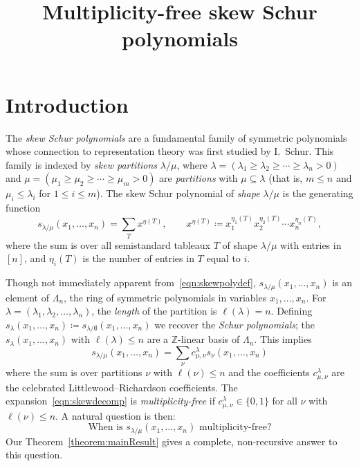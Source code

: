 \documentclass[ALCO,ThmDefs,Unicode,epreuves]{cedram}
\author{\firstname{Shiliang} \lastname{Gao}}
\author{\firstname{Reuven} \lastname{Hodges}}
\author{\firstname{Gidon} \lastname{Orelowitz}}
\title{Multiplicity-free skew Schur polynomials}
\begin{document}
\maketitle



\section{Introduction}\label{sec:intro}

The \emph{skew Schur polynomials} are a fundamental family of symmetric polynomials whose connection to representation theory was first studied by I.~Schur. This family is indexed by \emph{skew partitions} $\lambda / \mu$, where $\lambda = (\lambda_1 \geq \lambda_2 \geq \cdots \geq \lambda_n > 0)$ and $\mu = (\mu_1 \geq \mu_2 \geq \cdots \geq \mu_m > 0)$ are \emph{partitions} with $\mu \subseteq \lambda$ (that is, $m \leq n$ and $\mu_i \leq \lambda_i$ for $1\leq i \leq m$). The skew Schur polynomial of \emph{shape} $\lambda / \mu$ is the generating function
\begin{equation}
\label{eqn:skewpolydef}
s_{\lambda / \mu}(x_1,\ldots,x_n) = \sum_T x^{\eta(T)}, \qquad x^{\eta(T)}\coloneqq x_1^{\eta_1(T)}x_2^{\eta_2(T)}\cdots x_n^{\eta_n(T)},
\end{equation}
where the sum is over all semistandard tableaux $T$ of shape $\lambda / \mu$ with entries in $[n]$, and $\eta_i(T)$ is the number of entries in $T$ equal to $i$.

Though not immediately apparent from~\eqref{eqn:skewpolydef}, $s_{\lambda / \mu}(x_1,\ldots,x_n)$ is an element of $\Lambda_n$, the ring of symmetric polynomials in variables $x_1,\ldots,x_n$. For $\lambda = (\lambda_1, \lambda_2, \hdots ,\lambda_n )$, the \emph{length} of the partition is $\ell(\lambda) = n$. Defining $s_{\lambda}(x_1,\ldots,x_n) \coloneqq s_{\lambda / \emptyset}(x_1,\ldots,x_n)$ we recover the \emph{Schur polynomials}; the $s_{\lambda}(x_1,\ldots,x_n)$ with $\ell(\lambda) \leq n$ are a $\mathbb{Z}$-linear basis of $\Lambda_n$. This implies
\begin{equation}
\label{eqn:skewdecomp}
s_{\lambda / \mu}(x_1,\ldots,x_n) = \sum_\nu c_{\mu,\nu}^{\lambda} s_{\nu}(x_1,\ldots,x_n)
\end{equation}
where the sum is over partitions $\nu$ with $\ell(\nu) \leq n$ and the coefficients $c_{\mu,\nu}^{\lambda}$ are the celebrated Littlewood--Richardson coefficients. The expansion~\eqref{eqn:skewdecomp} is \emph{multiplicity-free} if $c_{\mu,\nu}^{\lambda} \in \{0,1\}$ for all $\nu$ with $\ell(\nu) \leq n$. A natural question is then: 
\[
\text{When is $s_{\lambda / \mu}(x_1,\ldots,x_n)$ multiplicity-free?}
\] 
Our Theorem~\ref{theorem:mainResult} gives a complete, non-recursive answer to this question.
\end{document}
